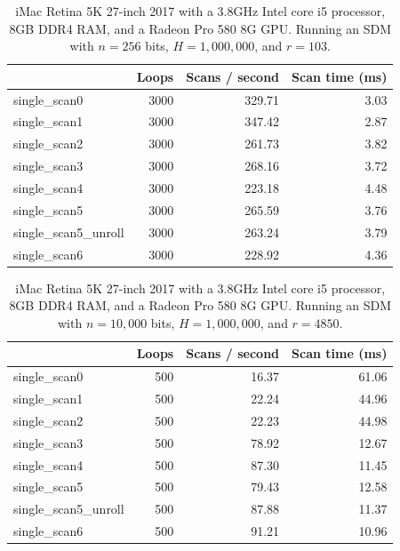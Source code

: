 \begin{table}[!htb]
\centering
\begin{tabular}{| l | r | r | r |}
    \hline
    & Loops & Scans / second & Scan time (ms) \\ \hline
    single\_scan0 & 3000 & 329.71 & 3.03 \\
    single\_scan1 & 3000 & 347.42 & 2.87 \\
    single\_scan2 & 3000 & 261.73 & 3.82 \\
    single\_scan3 & 3000 & 268.16 & 3.72 \\
    single\_scan4 & 3000 & 223.18 & 4.48 \\
    single\_scan5 & 3000 & 265.59 & 3.76 \\
    single\_scan5\_unroll & 3000 & 263.24 & 3.79 \\
    single\_scan6 & 3000 & 228.92 & 4.36 \\
\end{tabular}
\caption{iMac Retina 5K 27-inch 2017 with a 3.8GHz Intel core i5 processor, 8GB DDR4 RAM, and a Radeon Pro 580 8G GPU. Running an SDM with $n=256$ bits, $H=1,000,000$, and $r=103$.
\label{tab:perf-imac-256}}
\end{table}

\begin{table}[!htb]
\centering
\begin{tabular}{| l | r | r | r |}
    \hline
    & Loops & Scans / second & Scan time (ms) \\ \hline
    single\_scan0 & 500 & 16.37 & 61.06 \\
    single\_scan1 & 500 & 22.24 & 44.96 \\
    single\_scan2 & 500 & 22.23 & 44.98 \\
    single\_scan3 & 500 & 78.92 & 12.67 \\
    single\_scan4 & 500 & 87.30 & 11.45 \\
    single\_scan5 & 500 & 79.43 & 12.58 \\
    single\_scan5\_unroll & 500 & 87.88 & 11.37 \\
    single\_scan6 & 500 & 91.21 & 10.96 \\
\end{tabular}
\caption{iMac Retina 5K 27-inch 2017 with a 3.8GHz Intel core i5 processor, 8GB DDR4 RAM, and a Radeon Pro 580 8G GPU. Running an SDM with $n=10,000$ bits, $H=1,000,000$, and $r=4850$.
\label{tab:perf-imac-256}}
\end{table}

